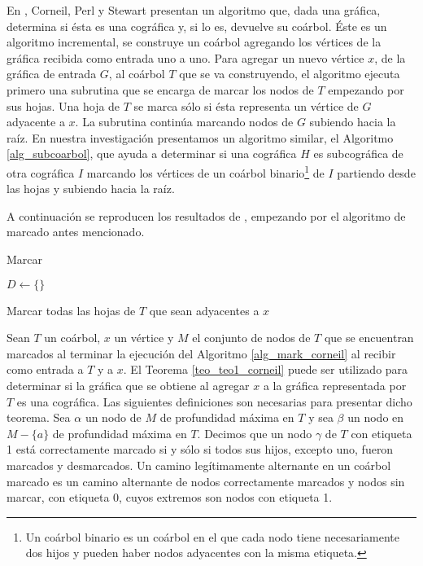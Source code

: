 En \cite{Corneil02}, Corneil, Perl y Stewart presentan un algoritmo
que, dada una gráfica, determina si ésta es una cográfica y, si lo
es, devuelve su coárbol. Éste es un algoritmo incremental, se
construye un coárbol agregando los vértices de la gráfica recibida
como entrada uno a uno. Para agregar un nuevo vértice $x$, de la
gráfica de entrada $G$, al coárbol $T$ que se va construyendo, el
algoritmo ejecuta primero una subrutina que se encarga de marcar los
nodos de $T$ empezando por sus hojas. Una hoja de $T$ se marca sólo
si ésta representa un vértice de $G$ adyacente a $x$. La subrutina
continúa marcando nodos de $G$ subiendo hacia la raíz. En nuestra
investigación presentamos un algoritmo similar, el Algoritmo
\ref{alg_subcoarbol}, que ayuda a determinar si una cográfica
$H$ es subcográfica de otra cográfica $I$ marcando los vértices de
un coárbol binario\footnote{Un coárbol binario es un coárbol en el
que cada nodo tiene necesariamente dos hijos y pueden haber nodos
adyacentes con la misma etiqueta.} de $I$ partiendo desde las hojas
y subiendo hacia la raíz.

A continuación se reproducen los resultados de \cite{ Corneil02},
empezando por el algoritmo de marcado antes mencionado.

\begin{algorithm}[!htbp]
\caption{Marcar}
\label{alg_mark_corneil}
\DontPrintSemicolon %

$D\gets \{\}$  \; 

Marcar todas las hojas de $T$ que sean adyacentes a $x$\;


\end{algorithm}
Sean $T$ un coárbol, $x$ un vértice y $M$ el conjunto de nodos
de $T$ que se encuentran marcados al terminar la ejecución del
Algoritmo \ref{alg_mark_corneil} al recibir como entrada a $T$
y a $x$. El Teorema \ref{teo_teo1_corneil} puede ser utilizado
para determinar si la gráfica que se obtiene al agregar $x$ a
la gráfica representada por $T$ es una cográfica.
Las siguientes definiciones son necesarias para presentar dicho
teorema. Sea $\alpha$ un nodo de $M$ de profundidad máxima en $T$
y sea $\beta$ un nodo en $M-\{a\}$ de profundidad máxima en $T$.
Decimos que un nodo $\gamma$ de $T$ con etiqueta 1 está
correctamente marcado si y sólo si todos sus hijos, excepto uno,
fueron marcados y desmarcados. Un camino legítimamente alternante
en un coárbol marcado es un camino alternante de nodos correctamente
marcados y nodos sin marcar, con etiqueta 0, cuyos extremos son nodos
con etiqueta 1.


